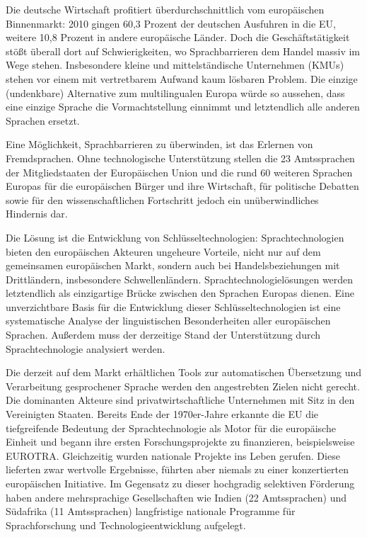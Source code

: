 \documentclass[]{../../metanetpaper}
\begin{document}
\begin{Parallel}[c]{79mm}{78mm}
{Die deutsche Wirtschaft profitiert überdurchschnittlich vom europäischen Binnenmarkt: 2010 gingen 60,3 Prozent der deutschen Ausfuhren in die EU, weitere 10,8 Prozent in andere europäische Länder. Doch die Geschäftstätigkeit stößt überall dort auf Schwierigkeiten, wo Sprachbarrieren dem Handel massiv im Wege stehen. Insbesondere kleine und mittelständische Unternehmen (KMUs) stehen vor einem mit vertretbarem Aufwand kaum lösbaren Problem. Die einzige (undenkbare) Alternative zum multilingualen Europa würde so aussehen, dass eine einzige Sprache die Vormachtstellung einnimmt und letztendlich alle anderen Sprachen ersetzt. 

Eine Möglichkeit, Sprachbarrieren zu überwinden, ist das Erlernen von Fremdsprachen. Ohne technologische Unterstützung stellen die 23 Amts\-sprachen der Mitgliedstaaten der Europäischen Union und die rund 60 weiteren Sprachen Europas für die europäischen Bürger und ihre Wirtschaft, für politische Debatten sowie für den wissenschaftlichen Fortschritt jedoch ein unüberwindliches Hindernis dar. 

Die Lösung ist die Entwicklung von Schlüsseltechnologien: Sprachtechnologien bieten den europäischen Akteuren ungeheure Vorteile, nicht nur auf dem gemeinsamen europäischen Markt, sondern auch bei Handelsbeziehungen mit Drittländern, insbesondere Schwellenländern. Sprachtechnologielösungen werden letztendlich als einzigartige Brücke zwischen den Sprachen Europas dienen. Eine unverzichtbare Basis für die Entwicklung dieser Schlüsseltechnologien ist eine systematische Analyse der linguistischen Besonderheiten aller europäischen Sprachen. Außerdem muss der derzeitige Stand der Unterstützung durch Sprachtechnologie analysiert werden. 
    
    
Die derzeit auf dem Markt erhältlichen Tools zur automatischen Übersetzung und Verarbeitung gesprochener Sprache werden den angestrebten Zielen nicht gerecht. Die dominanten Akteure sind privatwirtschaftliche Unternehmen mit Sitz in den Vereinigten Staaten. Bereits Ende der 1970er-Jahre erkannte die EU die tiefgreifende Bedeutung der Sprachtechnologie als Motor für die europäische Einheit und begann ihre ersten Forschungsprojekte zu finanzieren, beispielsweise EUROTRA. Gleichzeitig wurden nationale Projekte ins Leben gerufen. Diese lieferten zwar wertvolle Ergebnisse, führten aber niemals zu einer konzertierten europäischen Initiative. Im Gegensatz zu dieser hochgradig selektiven Förderung haben andere mehrsprachige Gesellschaften wie Indien (22 Amtssprachen) und Südafrika (11 Amtssprachen) langfristige nationale Programme für Sprachforschung und Technologieentwicklung aufgelegt. 

}
\end{Parallel}
\end{document}
